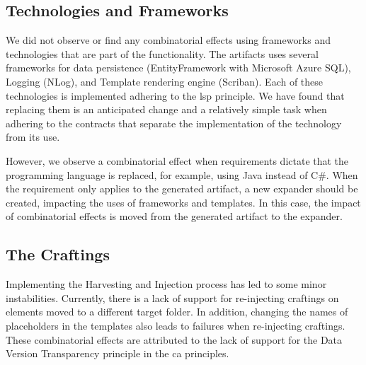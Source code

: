 \subsection{Technologies and Frameworks}
We did not observe or find any combinatorial effects using frameworks and technologies
that are part of the functionality. The artifacts uses several frameworks for data
persistence (EntityFramework with Microsoft Azure SQL), Logging (NLog), and Template
rendering engine (Scriban). Each of these technologies is implemented adhering to the
\gls{lsp} principle. We have found that replacing them is an anticipated change and a
relatively simple task when adhering to the contracts that separate the implementation of
the technology from its use.

However, we observe a combinatorial effect when requirements dictate that the programming
language is replaced, for example, using Java instead of C\#. When the requirement only
applies to the generated artifact, a new expander should be created, impacting the uses of
frameworks and templates. In this case, the impact of combinatorial effects is moved from
the generated artifact to the expander.


\subsection{The Craftings}
Implementing the Harvesting and Injection process has led to some minor instabilities.
Currently, there is a lack of support for re-injecting craftings on elements moved to a
different target folder. In addition, changing the names of placeholders in the templates
also leads to failures when re-injecting craftings. These combinatorial effects are
attributed to the lack of support for the Data Version Transparency principle in the
\gls{ca} principles.